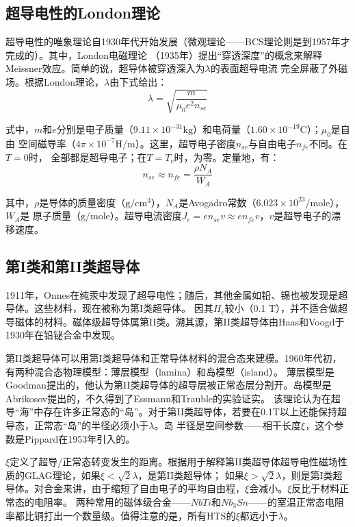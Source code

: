 \subsection{超导电性的London理论}
超导电性的唯象理论自1930年代开始发展（微观理论——BCS理论则是到1957年才完成的）。其中，London电磁理论
（1935年）提出“穿透深度”的概念来解释Meissner效应。简单的说，超导体被穿透深入为$\lambda$的表面超导电流
完全屏蔽了外磁场。根据London理论，$\lambda$由下式给出：
\begin{equation}
\lambda=\sqrt{\frac{m}{\mu_0 e^2 n_{se}}}
\end{equation}

式中，$m$和$e$分别是电子质量（$9.11\times 10^{-31}\mathrm{kg}$）和电荷量（$1.60\times 10^{-19}\mathrm{C}$）；$\mu_0$是自由
空间磁导率（$4\pi \times 10^{-7}\mathrm{H/m}$）。这里，超导电子密度$n_{se}$与自由电子$n_{fe}$不同。在$T=0$时，
全部都是超导电子；在$T=T_c$时，为零。定量地，有：
\begin{equation}
n_{se}\approx n_{fe}=\frac{\rho N_A}{W_A}
\end{equation}

其中，$\rho$是导体的质量密度（$\mathrm{g/cm^3}$），$N_A$是Avogadro常数（$6.023\times 10^{23}/\mathrm{mole}$），$W_A$是
原子质量（$\mathrm{g/mole}$）。超导电流密度$J_c=e n_{se} v\approx e n_{fe} v$，$v$是超导电子的漂移速度。

\subsection{第I类和第II类超导体}
1911年，Onnes在纯汞中发现了超导电性；随后，其他金属如铅、锡也被发现是超导体。这些材料，现在被称为第I类超导体。
因其$H_c$较小（0.1 T），并不适合做超导磁体的材料。磁体级超导体属第II类。溯其源，第II类超导体由Haas和Voogd于
1930年在铅铋合金中发现。

第II类超导体可以用第I类超导体和正常导体材料的混合态来建模。1960年代初，有两种混合态物理模型：薄层模型（lamina）和岛模型（island）。
薄层模型是Goodman提出的，他认为第II类超导体的超导层被正常态层分割开。岛模型是Abrikosov提出的，不久得到了Essmann和Trauble的实验证实。
该理论认为在超导“海”中存在许多正常态的“岛”。对于第II类超导体，若要在0.1T以上还能保持超导态，正常态“岛”的半径必须小于$\lambda$。岛
半径是空间参数——相干长度$\xi$，这个参数是Pippard在1953年引入的。

$\xi$定义了超导/正常态转变发生的距离。根据用于解释第II类超导体超导电性磁场性质的GLAG理论，如果$\xi < \sqrt{2}\lambda$，是第II类超导体；
如果$\xi >\sqrt{2}\lambda$，则是第I类超导体。对合金来讲，由于缩短了自由电子的平均自由程，$\xi$会减小。$\xi$反比于材料正常态的电阻率。
两种常用的磁体级合金——$NbTi$和$Nb_3Sn$——的室温正常态电阻率都比铜打出一个数量级。值得注意的是，所有HTS的$\xi$都远小于$\lambda$。

